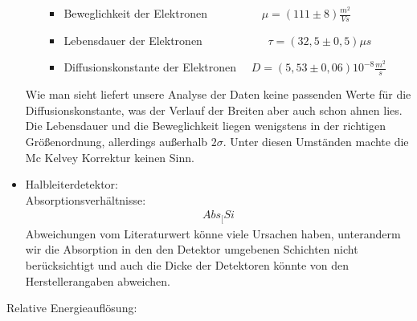 \documentclass[12pt]{article}
\begin{document}
\begin{itemize}
\begin{itemize}
\begin{itemize}
 \item Beweglichkeit der Elektronen ~~~~~~~~~$\mu = (111 \pm 8) \frac{m^2}{Vs}$ 
 \item Lebensdauer der Elektronen ~~~~~~~~~~~$\tau = (32,5 \pm 0,5) \mu s $
 \item Diffusionskonstante der Elektronen ~~$D = (5,53 \pm 0,06) 10^{-8} \frac{m^2}{s}$
\end{itemize}
\end{itemize}
Wie man sieht liefert unsere Analyse der Daten keine passenden Werte für die Diffusionskonstante, was der Verlauf der Breiten aber auch schon ahnen lies. Die Lebensdauer und die Beweglichkeit liegen wenigstens in der richtigen Größenordnung, allerdings außerhalb $2\sigma$. Unter diesen Umständen machte die Mc Kelvey Korrektur keinen Sinn.


\item Halbleiterdetektor: \\

Absorptionsverhältnisse: 
\begin{align*}
 Abs_[Si
\end{align*}
Abweichungen vom Literaturwert könne viele Ursachen haben, unteranderm wir die Absorption in den den Detektor umgebenen Schichten nicht berücksichtigt und auch die Dicke der Detektoren könnte von den Herstellerangaben abweichen.\\
\end{itemize}
Relative Energieauflösung:
\end{document}

